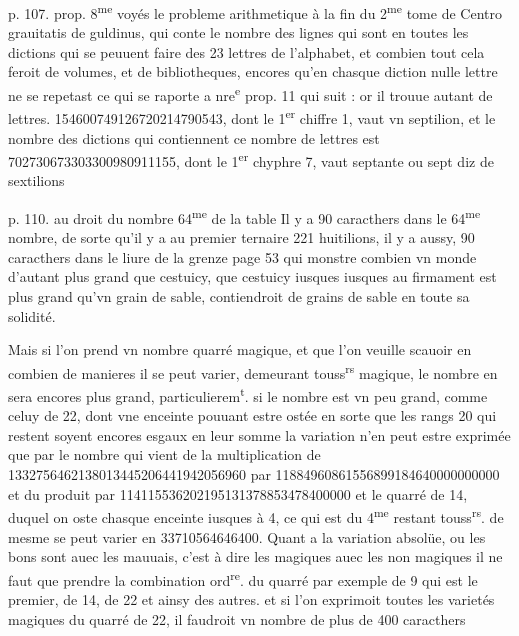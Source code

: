 \documentclass[11pt,a4paper]{article}
\begin{document}
p. 107. prop. 8\textsuperscript{me}
voyés le probleme arithmetique à la fin du 2\textsuperscript{me} tome de Centro grauitatis de guldinus, qui conte le nombre des lignes qui sont en toutes les dictions qui se peuuent faire des 23 lettres de l'alphabet, et combien tout cela feroit de volumes, et de bibliotheques, encores qu'en chasque diction nulle lettre ne se repetast ce qui se raporte a nre\textsuperscript{e} prop. 11 qui suit : or il trouue autant de lettres. 154600749126720214790543, dont le 1\textsuperscript{er} chiffre 1, vaut vn septilion, et le nombre des dictions qui contiennent ce nombre de lettres est 702730673303300980911155, dont le 1\textsuperscript{er} chyphre 7, vaut septante ou sept diz de sextilions

p. 110. au droit du nombre 64\textsuperscript{me} de la table
Il y a 90 caracthers dans le 64\textsuperscript{me} nombre, de sorte qu'il y a au premier ternaire 221 huitilions, il y a aussy, 90 caracthers dans le liure de la grenze page 53 qui monstre combien vn monde d'autant plus grand que cestuicy, que cestuicy iusques iusques au firmament est plus grand qu'vn grain de sable, contiendroit de grains de sable en toute sa solidité.

Mais si l'on prend vn nombre quarré magique, et que l'on veuille scauoir en combien de manieres il se peut varier, demeurant touss\textsuperscript{rs} magique, le nombre en sera encores plus grand, particulierem\textsuperscript{t}. si le nombre est vn peu grand, comme celuy de 22, dont vne enceinte pouuant estre ostée en sorte que les rangs 20 qui restent soyent encores esgaux en leur somme la variation n'en peut estre exprimée que par le nombre qui vient de la multiplication de 1332756462138013445206441942056960
par 11884960861556899184640000000000
et du produit par 114115536202195131378853478400000
et le quarré de 14, duquel on oste chasque enceinte iusques à 4, ce qui est du 4\textsuperscript{me} restant touss\textsuperscript{rs}. de mesme se peut varier en 33710564646400.
Quant a la variation absolüe, ou les bons sont auec les mauuais, c'est à dire les magiques auec les non magiques il ne faut que prendre la combination ord\textsuperscript{re}. du quarré par exemple de 9 qui est le premier, de 14, de 22 et ainsy des autres. et si l'on exprimoit toutes les varietés magiques du quarré de 22, il faudroit vn nombre de plus de 400 caracthers
\end{document}
